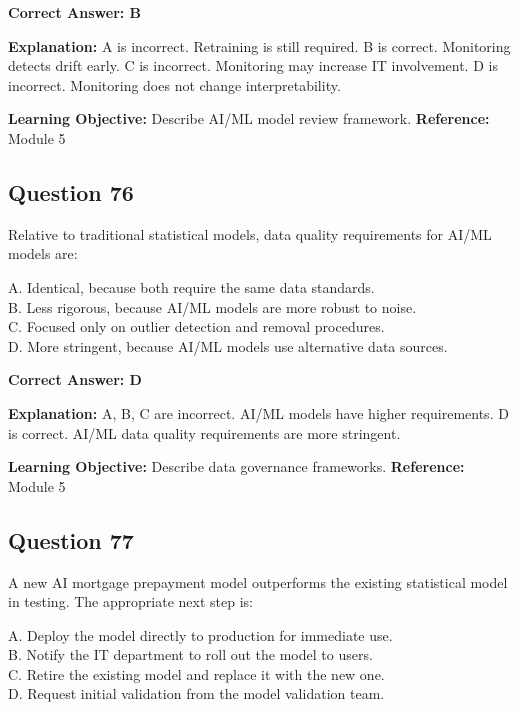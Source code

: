 \documentclass[11pt]{article}
\begin{document}
	\vspace{0.4em}
	\textbf{Correct Answer: B}
	
	\textbf{Explanation:}
	A is incorrect. Retraining is still required.
	B is correct. Monitoring detects drift early.
	C is incorrect. Monitoring may increase IT involvement.
	D is incorrect. Monitoring does not change interpretability.
	
	\textbf{Learning Objective:} Describe AI/ML model review framework.
	\textbf{Reference:} Module 5
	
	\subsection*{Question 76}
	Relative to traditional statistical models, data quality requirements
	for AI/ML models are:
	
	A. Identical, because both require the same data standards.\\
	B. Less rigorous, because AI/ML models are more robust to noise.\\
	C. Focused only on outlier detection and removal procedures.\\
	D. More stringent, because AI/ML models use alternative data sources.
	
	\vspace{0.4em}
	\textbf{Correct Answer: D}
	
	\textbf{Explanation:}
	A, B, C are incorrect. AI/ML models have higher requirements.
	D is correct. AI/ML data quality requirements are more stringent.
	
	\textbf{Learning Objective:} Describe data governance frameworks.
	\textbf{Reference:} Module 5
	
	\subsection*{Question 77}
	A new AI mortgage prepayment model outperforms the existing statistical
	model in testing. The appropriate next step is:
	
	A. Deploy the model directly to production for immediate use.\\
	B. Notify the IT department to roll out the model to users.\\
	C. Retire the existing model and replace it with the new one.\\
	D. Request initial validation from the model validation team.
	
\end{document}
